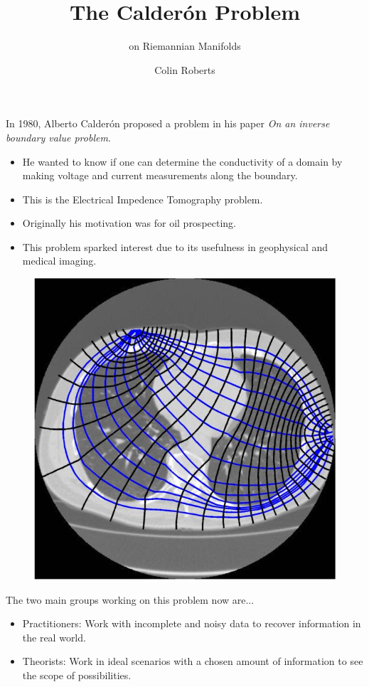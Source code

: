 \documentclass[aspectratio=169]{beamer}
\author{Colin Roberts}
\title{The Calder\'on Problem}
\subtitle{on Riemannian Manifolds}
\begin{document}
\begin{frame}{}
\vfill
In 1980, Alberto Calder\'on proposed a problem in his paper \emph{On an inverse boundary value problem}. 
\pause
    \begin{itemize}
        \item He wanted to know if one can determine the conductivity of a domain by making voltage and current measurements along the boundary.
        
        \pause
        \item This is the Electrical Impedence Tomography problem.
        
        \pause
        \item Originally his motivation was for oil prospecting. 
        
        \pause
        \item This problem sparked interest due to its usefulness in geophysical and medical imaging.
    \end{itemize}
\vfill
\end{frame}

\begin{frame}{}
\vfill
\begin{figure}[H]
    \centering
    \includegraphics[width=.5\textwidth]{eit.jpg}
\end{figure}
\vfill
\end{frame}

\begin{frame}{}
\vfill
The two main groups working on this problem now are... 
\pause
    \begin{itemize}
        \item Practitioners: Work with incomplete and noisy data to recover information in the real world.
        
        \pause
        \item Theorists: Work in ideal scenarios with a chosen amount of information to see the scope of possibilities.
    \end{itemize}
\vfill    
\end{frame}
\end{document}
